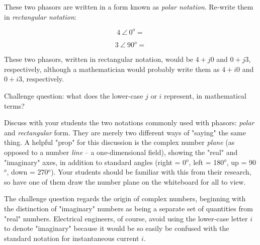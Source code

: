 

These two phasors are written in a form known as {\it polar notation}.  Re-write them in {\it rectangular notation}:

$$4 \> \angle \> 0^o = $$ 

$$3 \> \angle \> 90^o = $$ 







These two phasors, written in rectangular notation, would be $4 + j0$ and $0 + j3$, respectively, although a mathematician would probably write them as $4 + i0$ and $0 + i3$, respectively.

\vskip 10pt

Challenge question: what does the lower-case $j$ or $i$ represent, in mathematical terms?







Discuss with your students the two notations commonly used with phasors: {\it polar} and {\it rectangular} form.  They are merely two different ways of "saying" the same thing.  A helpful "prop" for this discussion is the complex number {\it plane} (as opposed to a number {\it line} -- a one-dimensional field), showing the "real" and "imaginary" axes, in addition to standard angles (right = 0$^{o}$, left = 180$^{o}$, up = 90$^{o}$, down = 270$^{o}$).  Your students should be familiar with this from their research, so have one of them draw the number plane on the whiteboard for all to view.

The challenge question regards the origin of complex numbers, beginning with the distinction of "imaginary" numbers as being a separate set of quantities from "real" numbers.  Electrical engineers, of course, avoid using the lower-case letter $i$ to denote "imaginary" because it would be so easily be confused with the standard notation for instantaneous current $i$.




